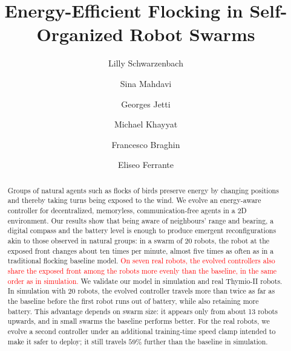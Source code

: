 \documentclass[runningheads]{llncs}
\newcommand{\rev}[1]{\textcolor{red}{#1}}
\begin{document}
%

\title{Energy-Efficient Flocking in Self-Organized Robot Swarms}
%

%
\author{
Lilly Schwarzenbach \and
Sina Mahdavi \and
Georges Jetti \and
Michael Khayyat \and
Francesco Braghin \and
Eliseo Ferrante}

%
%

%
\maketitle              %
%
\begin{abstract} %

Groups of natural agents such as flocks of birds preserve energy by changing positions and thereby taking turns being exposed to the wind. We evolve an energy-aware controller for decentralized, memoryless, communication-free agents in a 2D environment. Our results show that being aware of neighbours' range and bearing, a digital compass and the battery level is enough to produce emergent reconfigurations akin to those observed in natural groups: in a swarm of 20 robots, the robot at the exposed front changes about ten times per minute, almost five times as often as in a traditional flocking baseline model.  \rev{On seven real robots, the evolved controllers also share the exposed front among the robots more evenly than the baseline, in the same order as in simulation.}
We validate our model in simulation and real Thymio-II robots. In simulation with 20 robots, the evolved controller travels more than twice as far as the baseline before the first robot runs out of battery, while also retaining more battery. This advantage depends on swarm size: it appears only from about 13 robots upwards, and in small swarms the baseline performs better. For the real robots, we evolve a second controller under an additional training-time speed clamp intended to make it safer to deploy; it still travels $59\%$ further than the baseline in simulation.

\end{abstract}
%
%
%
\end{document}
